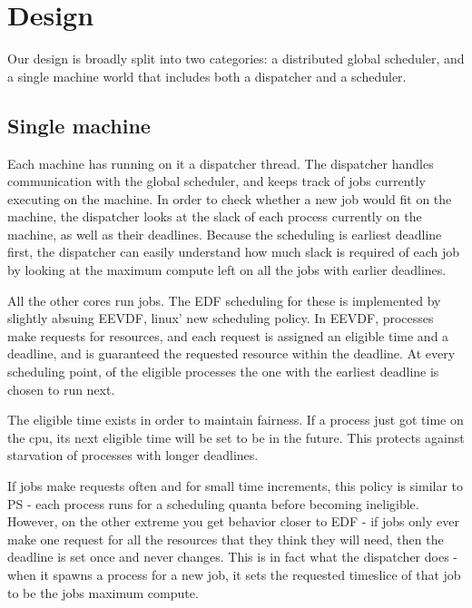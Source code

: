 \section{Design}

Our design is broadly split into two categories: a distributed global scheduler,
and a single machine world that includes both a dispatcher and a scheduler. 



\subsection*{Single machine}

Each machine has running on it a dispatcher thread. The dispatcher handles
communication with the global scheduler, and keeps track of jobs currently
executing on the machine. In order to check whether a new job would fit on the
machine, the dispatcher looks at the slack of each process currently on the
machine, as well as their deadlines. Because the scheduling is earliest deadline
first, the dispatcher can easily understand how much slack is required of each
job by looking at the maximum compute left on all the jobs with earlier
deadlines. 

All the other cores run jobs. The EDF scheduling for these is implemented by
slightly absuing EEVDF, linux' new scheduling policy. In EEVDF, processes make
requests for resources, and each request is assigned an eligible time and a
deadline, and is guaranteed the requested resource within the deadline. At every
scheduling point, of the eligible processes the one with the earliest deadline
is chosen to run next. 

The eligible time exists in order to maintain fairness. If a process just got
time on the cpu, its next eligible time will be set to be in the future. This
protects against starvation of processes with longer deadlines.

If jobs make requests often and for small time increments, this policy is
similar to PS - each process runs for a scheduling quanta before becoming
ineligible. However, on the other extreme you get behavior closer to EDF - if
jobs only ever make one request for all the resources that they think they will
need, then the deadline is set once and never changes. This is in fact what the
dispatcher does - when it spawns a process for a new job, it sets the requested
timeslice of that job to be the jobs maximum compute. 

